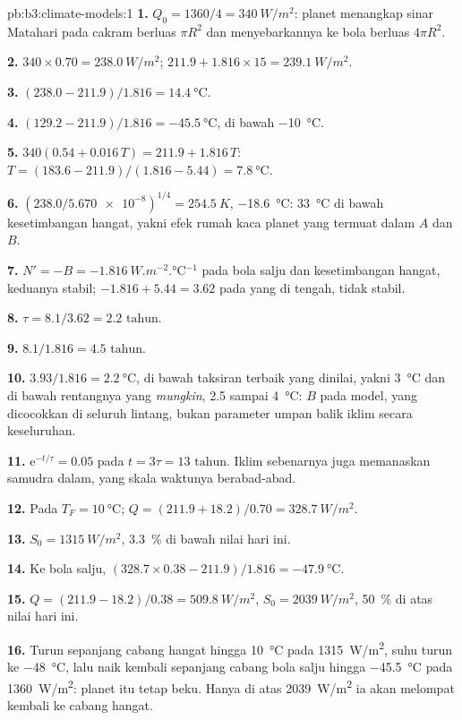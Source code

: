 \begin{solution}{pb:b3:climate-models:1}
\textbf{1.} $Q_0 = 1360/4 = \qty{340}{W/m^2}$: planet menangkap
sinar Matahari pada cakram berluas $\pi R^2$ dan menyebarkannya ke bola berluas
$4\pi R^2$.

\textbf{2.} $340\times0.70 = \qty{238.0}{W/m^2}$; $211.9 + 1.816\times15 =
\qty{239.1}{W/m^2}$.

\textbf{3.} $(238.0 - 211.9)/1.816 = \qty{14.4}{\celsius}$.

\textbf{4.} $(129.2 - 211.9)/1.816 = \qty{-45.5}{\celsius}$, di bawah
\qty{-10}{\celsius}.

\textbf{5.} $340(0.54 + 0.016\,T) = 211.9 + 1.816\,T$: $T =
(183.6 - 211.9)/(1.816 - 5.44) = \qty{7.8}{\celsius}$.

\textbf{6.} $(238.0/\num{5.670e-8})^{1/4} = \qty{254.5}{K}$,
\qty{-18.6}{\celsius}: \qty{33}{\celsius} di bawah kesetimbangan hangat, yakni
efek rumah kaca planet yang termuat dalam $A$ dan $B$.

\textbf{7.} $N' = -B = \qty{-1.816}{W.m^{-2}.\celsius^{-1}}$ pada
bola salju dan kesetimbangan hangat, keduanya stabil; $-1.816 + 5.44 =
\num{+3.62}$ pada yang di tengah, tidak stabil.

\textbf{8.} $\tau = 8.1/3.62 = \num{2.2}\text{ tahun}$.

\textbf{9.} $8.1/1.816 = \num{4.5}\text{ tahun}$.

\textbf{10.} $3.93/1.816 = \qty{2.2}{\celsius}$, di bawah taksiran terbaik yang dinilai,
yakni \qty{3}{\celsius} dan di bawah rentangnya yang \emph{mungkin}, 2.5 sampai
\qty{4}{\celsius}: $B$ pada model, yang dicocokkan di seluruh lintang, bukan
parameter umpan balik iklim secara keseluruhan.

\textbf{11.} $\mathrm e^{-t/\tau} = 0.05$ pada $t = 3\tau =
\num{13}\text{ tahun}$. Iklim sebenarnya juga memanaskan samudra dalam, yang
skala waktunya berabad-abad.

\textbf{12.} Pada $T_F = \qty{10}{\celsius}$; $Q = (211.9 + 18.2)/0.70 =
\qty{328.7}{W/m^2}$.

\textbf{13.} $S_0 = \qty{1315}{W/m^2}$, \qty{3.3}{\percent} di bawah nilai hari ini.

\textbf{14.} Ke bola salju, $(328.7\times0.38 - 211.9)/1.816 =
\qty{-47.9}{\celsius}$.

\textbf{15.} $Q = (211.9 - 18.2)/0.38 = \qty{509.8}{W/m^2}$, $S_0 =
\qty{2039}{W/m^2}$, \qty{50}{\percent} di atas nilai hari ini.

\textbf{16.} Turun sepanjang cabang hangat hingga \qty{10}{\celsius} pada
\qty{1315}{W/m^2}, suhu turun ke \qty{-48}{\celsius}, lalu naik kembali sepanjang
cabang bola salju hingga \qty{-45.5}{\celsius} pada \qty{1360}{W/m^2}: planet itu
tetap beku. Hanya di atas \qty{2039}{W/m^2} ia akan melompat kembali ke
cabang hangat.


\end{solution}
